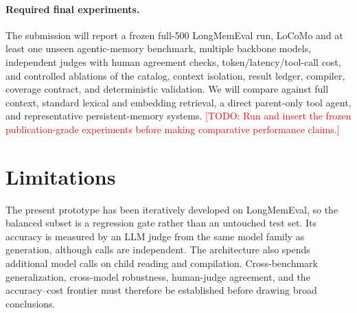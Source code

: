 \documentclass{article}
\newcommand{\todo}[1]{\textcolor{red}{[TODO: #1]}}
\begin{document}
\paragraph{Required final experiments.}
The submission will report a frozen full-500 LongMemEval run, LoCoMo and at
least one unseen agentic-memory benchmark, multiple backbone models, independent
judges with human agreement checks, token/latency/tool-call cost, and controlled
ablations of the catalog, context isolation, result ledger, compiler, coverage
contract, and deterministic validation. We will compare against full context,
standard lexical and embedding retrieval, a direct parent-only tool agent, and
representative persistent-memory systems. \todo{Run and insert the frozen
publication-grade experiments before making comparative performance claims.}

\section{Limitations}

The present prototype has been iteratively developed on LongMemEval, so the
balanced subset is a regression gate rather than an untouched test set. Its
accuracy is measured by an LLM judge from the same model family as generation,
although calls are independent. The architecture also spends additional model
calls on child reading and compilation. Cross-benchmark generalization,
cross-model robustness, human-judge agreement, and the accuracy--cost frontier
must therefore be established before drawing broad conclusions.



\end{document}
